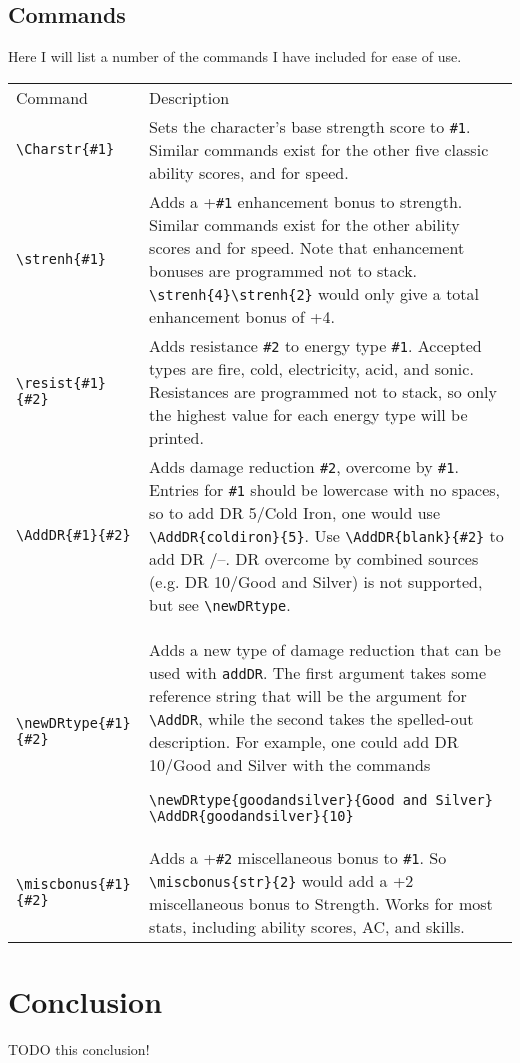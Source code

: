 \documentclass[oneside]{article}
\begin{document}
\subsection{Commands}
Here I will list a number of the commands I have included for ease of use.
\begin{tabular}{lp{8cm}}
Command & Description\\
\verb|\Charstr{#1}| & Sets the character's base strength score to \verb|#1|. Similar commands exist for the other five classic ability scores, and for speed.\\
\verb|\strenh{#1}| & Adds a +\verb|#1| enhancement bonus to strength.  Similar commands exist for the other ability scores and for speed.  Note that enhancement bonuses are programmed not to stack.  \verb|\strenh{4}\strenh{2}| would only give a total enhancement bonus of +4.\\
\verb|\resist{#1}{#2}| & Adds resistance \verb|#2| to energy type \verb|#1|.  Accepted types are fire, cold, electricity, acid, and sonic.  Resistances are programmed not to stack, so only the highest value for each energy type will be printed.\\
\verb|\AddDR{#1}{#2}| & Adds damage reduction \verb|#2|, overcome by \verb|#1|. Entries for \verb|#1| should be lowercase with no spaces, so to add DR 5/Cold Iron, one would use \verb|\AddDR{coldiron}{5}|.  Use \verb|\AddDR{blank}{#2}| to add DR /--. DR overcome by combined sources (e.g. DR 10/Good and Silver) is not supported, but see \verb|\newDRtype|.\\
\verb|\newDRtype{#1}{#2}| & Adds a new type of damage reduction that can be used with \verb|addDR|. The first argument takes some reference string that will be the argument for \verb|\AddDR|, while the second takes the spelled-out description.  For example, one could add DR 10/Good and Silver with the commands
\begin{verbatim}
\newDRtype{goodandsilver}{Good and Silver}
\AddDR{goodandsilver}{10}
\end{verbatim}\\
\verb|\miscbonus{#1}{#2}| & Adds a +\verb|#2| miscellaneous bonus to \verb|#1|.  So \verb|\miscbonus{str}{2}| would add a +2 miscellaneous bonus to Strength. Works for most stats, including ability scores, AC, and skills.
\end{tabular}
\section{Conclusion}
\label{sec:conclusion}

TODO this conclusion!
\end{document}
